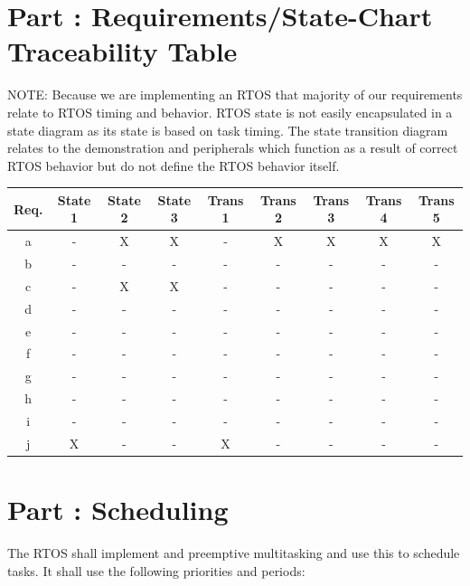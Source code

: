 \documentclass{article}
\newcounter{partNum}
\newcommand{\partNum}{%
        \stepcounter{partNum}%
        \thepartNum}
\newcommand{\sectPart}[1]{\section*{Part \partNum: #1}}
\begin{document}
\newpage

\sectPart{Requirements/State-Chart Traceability Table}

NOTE: Because we are implementing an RTOS that majority of our requirements relate to RTOS timing and behavior. RTOS state is not easily encapsulated in a state diagram as its state is based on task timing. The state transition diagram relates to the demonstration and peripherals which function as a result of correct RTOS behavior but do not define the RTOS behavior itself.

\vspace*{1em}

\begin{center}
    \begin{tabular}{| c | c | c | c | c | c | c | c | c |}
        \hline
    Req. & State 1 & State 2 & State 3 & Trans 1 & Trans 2 & Trans 3 & Trans 4 & Trans 5 \\ \hline
    a & - & X & X & - & X & X & X & X \\ \hline
    b & - & - & - & - & - & - & - & - \\ \hline
    c & - & X & X & - & - & - & - & - \\ \hline
    d & - & - & - & - & - & - & - & - \\ \hline
    e & - & - & - & - & - & - & - & - \\ \hline
    f & - & - & - & - & - & - & - & - \\ \hline
    g & - & - & - & - & - & - & - & - \\ \hline
    h & - & - & - & - & - & - & - & - \\ \hline
    i & - & - & - & - & - & - & - & - \\ \hline
    j & X & - & - & X & - & - & - & - \\ \hline
    \end{tabular}
\end{center}


\sectPart{Scheduling}

The RTOS shall implement and preemptive multitasking and use this to schedule tasks. It shall use the following priorities and periods:

\vspace{1em}
\end{document}

